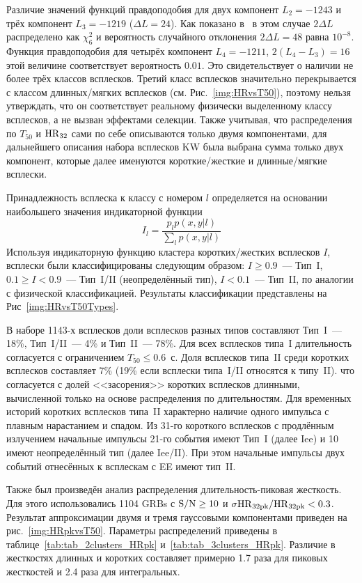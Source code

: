 Различие значений функций правдоподобия для двух компонент $L_2 = -1243$ и трёх 
компонент $L_3 = -1219$ ($\Delta L = 24$). Как показано в~\citep{Horvath_2006} 
в этом случае $2\Delta L$ распределено как $\chi^2_6$ и вероятность случайного 
отклонения $2\Delta L = 48$ равна $10^{-8}$. Функция правдоподобия для четырёх 
компонент $L_4 = -1211$, $2(L_4 - L_3) = 16$ этой величине соответствует вероятность $0.01$. 
Это свидетельствует о наличии не более трёх классов всплесков. Третий класс всплесков 
значительно перекрывается с классом длинных/мягких всплесков (см. Рис.~\ref{img:HRvsT50}), поэтому нельзя утверждать, 
что он соответствует реальному физически выделенному классу всплесков, а не вызван эффектами селекции. 
Также учитывая, что распределения по $T_{50}$ и ${\mathrm{HR}}_{32}$ сами по себе описываются 
только двумя компонентами, для дальнейшего описания набора всплесков KW была выбрана
сумма только двух компонент, которые далее именуются короткие/жесткие и длинные/мягкие всплески.

Принадлежность всплеска к классу с номером $l$ определяется на основании наибольшего 
значения индикаторной функции
\begin{equation}
I_l =\frac{p_l p(x,y|l)}{\sum_l  p(x, y|l)}
\end{equation}
Используя индикаторную функцию кластера коротких/жестких всплесков $I$, 
всплески были классифицированы следующим образом: 
$I \geq 0.9$~--- Тип~I, $0.1 \geq I < 0.9$~--- Тип~I/II (неопределённый тип), 
$I < 0.1$~--- Тип~II, по аналогии с физической классификацией. 
Результаты классификации представлены на Рис~\ref{img:HRvsT50Types}.

В наборе 1143-х всплесков доли всплесков разных типов составляют Тип~I~--- 18\%,
Тип~I/II~--- 4\% и Тип~II~--- 78\%. Для всех всплесков типа~I длительность согласуется 
с ограничением $T_{50} \leq 0.6$~с. Доля всплесков типа~II среди коротких всплесков 
составляет 7\% (19\% если всплески типа~I/II относятся к типу~II). что согласуется с долей
<<засорения>> коротких всплесков длинными, вычисленной только на основе распределения 
по длительностям. Для временных историй коротких всплесков типа~II характерно 
наличие одного импульса с плавным нарастанием и спадом.
Из 31-го короткого всплесков с продлённым излучением начальные импульсы 21-го события 
имеют Тип~I (далее Iee) и 10 имеют неопределённый тип (далее Iee/II).
При этом начальные импульсы двух событий отнесённых к всплескам с EE имеют тип~II.   %

Также был произведён анализ распределения длительность-пиковая жесткость. 
Для этого использовались 1104 GRBs с ${\mathrm{S/N}} \geq 10$ и $\sigma {\mathrm{HR}}_{32{\mathrm{pk}}}/{\mathrm{HR}}_{32{\mathrm{pk}}} <0.3$. 
Результат аппроксимации двумя и тремя гауссовыми компонентами приведен на рис.~\ref{img:HRpkvsT50}. 
Параметры распределений приведены в таблице~\ref{tab:tab_2clusters_HRpk} и~\ref{tab:tab_3clusters_HRpk}. 
Различие в жесткостях длинных и коротких составляет примерно 1.7 раза для пиковых 
жесткостей и 2.4 раза для интегральных. 

